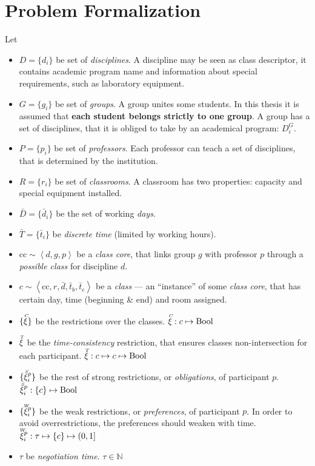 \documentclass[../header]{subfiles}
\begin{document}
\providecommand{\rootdir}{..}



\section{Problem Formalization}
\label{sec:ProblemFormal}


Let \begin{itemize}
\item $D=\{d_i\}$ be set of \emph{disciplines}.
  A discipline may be seen as class descriptor, it contains
  academic program name and information about special requirements,
  such as laboratory equipment.
\item $G=\{g_i\}$ be set of \emph{groups}.
  A group unites some students. In this thesis it is assumed that
  \textbf{each student belongs strictly to one group}.
  A group has a set of disciplines, that it is obliged to take by an
  academical program: $D^G_i$.
\item $P=\{p_i\}$ be set of \emph{professors}.
  Each professor can teach a set of disciplines, that is determined
  by the institution.
\item $R=\{r_i\}$ be set of \emph{classrooms}.
  A classroom has two properties: capacity and special equipment installed.
\item $\bar D=\{\bar d_i\}$ be the set of working \emph{days}.
\item $\bar T=\{\bar t_i\}$ be \emph{discrete time} (limited by working hours).
\item $\mathrm{cc} \sim \left< d, g, p \right>$ be a \emph{class core}, that
      links group $g$ with professor $p$ through a \emph{possible class} for
      discipline $d$.
\item $ c \sim \left< \mathrm{cc}, r, \bar d, \bar t_b, \bar t_e \right> $
      be a \emph{class} --- an ``instance'' of some \emph{class core}, that has
      certain day, time (beginning \& end) and room assigned.
\item $\{\accentset{C}{\xi}\}$ be the restrictions over the classes.
      $\accentset{C}{\xi} : c \mapsto \mathrm{Bool}$
\item $\accentset{T}{\xi}$ be the \emph{time-consistency} restriction, that ensures
  classes non-intersection for each participant.
      $\accentset{T}{\xi} : c \mapsto c \mapsto \mathrm{Bool}$
\item $\{\accentset{S}{\xi}^p_i\}$ be the rest of strong restrictions, or \emph{obligations},
      of participant $p$.
      $\accentset{S}{\xi}^p_i : \{c\} \mapsto \mathrm{Bool}$
\item $\{\accentset{W}{\xi}^p_i\}$ be the weak restrictions, or \emph{preferences}, of participant $p$.
      In order to avoid overrestrictions, the preferences should weaken with time.
      $\accentset{W}{\xi}^p_i : \tau \mapsto \{c\} \mapsto (0,1]$
\item $\tau$ be \emph{negotiation time}. $\tau \in \mathbb{N}$
\end{itemize}
\end{document}
